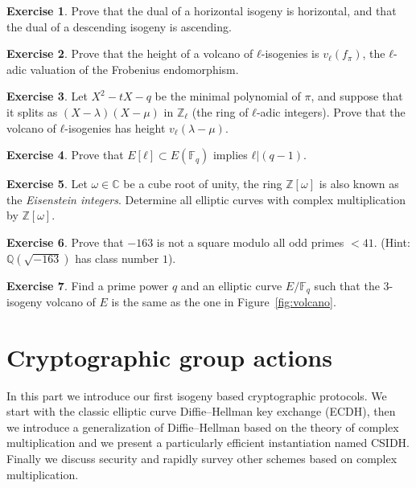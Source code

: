 \documentclass[10pt]{article}
\theoremstyle{plain}
\theoremstyle{definition}
\newtheorem{exercise}{Exercise}[part]
\def\F{\ensuremath{\mathbb{F}}}
\begin{document}
\begin{exercise}
  Prove that the dual of a horizontal isogeny is horizontal, and that
  the dual of a descending isogeny is ascending.
\end{exercise}

\begin{exercise}
  Prove that the height of a volcano of $ℓ$-isogenies is $v_ℓ(f_π)$,
  the $ℓ$-adic valuation of the Frobenius endomorphism.
\end{exercise}

\begin{exercise}
  Let $X^2-tX-q$ be the minimal polynomial of $π$, and suppose that it
  splits as $(X-λ)(X-μ)$ in $ℤ_ℓ$ (the ring of $ℓ$-adic integers). %
  Prove that the volcano of $ℓ$-isogenies has height $v_ℓ(λ-μ)$.
\end{exercise}

\begin{exercise}
  \label{ex:group-struct}
  Prove that $E[ℓ]⊂E(\F_q)$ implies $ℓ|(q-1)$.
\end{exercise}

\begin{exercise}
  Let $ω∈ℂ$ be a cube root of unity, the ring $ℤ[ω]$ is also known as
  the \emph{Eisenstein integers}. %
  Determine all elliptic curves with complex multiplication by $ℤ[ω]$.
\end{exercise}

\begin{exercise}
  Prove that $-163$ is not a square modulo all odd primes
  $<41$. (Hint: $ℚ(\sqrt{-163})$ has class number $1$).
\end{exercise}

\begin{exercise}
  Find a prime power $q$ and an elliptic curve $E/\F_q$ such that the
  $3$-isogeny volcano of $E$ is the same as the one in
  Figure~\ref{fig:volcano}.
\end{exercise}



\clearpage
\part{Cryptographic group actions}
\label{part:crypt-group-acti}

In this part we introduce our first isogeny based cryptographic
protocols. %
We start with the classic elliptic curve Diffie--Hellman key exchange
(ECDH), then we introduce a generalization of Diffie--Hellman based on
the theory of complex multiplication and we present a particularly
efficient instantiation named CSIDH. %
Finally we discuss security and rapidly survey other schemes based on
complex multiplication.
\end{document}

